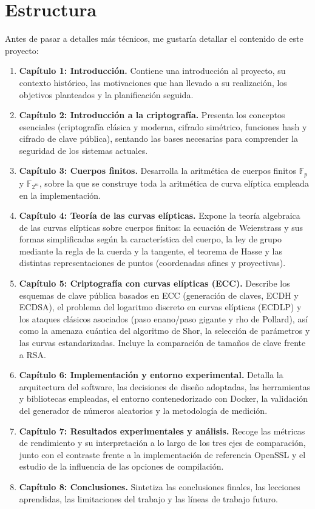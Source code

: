 \section{Estructura}
Antes de pasar a detalles más técnicos, me gustaría detallar el contenido
de este proyecto:

\begin{enumerate}
  \item \textbf{Capítulo 1: Introducción.}  
    Contiene una introducción al proyecto, su contexto histórico, las motivaciones que han llevado a su realización, los objetivos planteados y la planificación seguida.
  \item \textbf{Capítulo 2: Introducción a la criptografía.}  
    Presenta los conceptos esenciales (criptografía clásica y moderna, cifrado simétrico, funciones hash y cifrado de clave pública), sentando las bases necesarias para comprender la seguridad de los sistemas actuales.
  \item \textbf{Capítulo 3: Cuerpos finitos.}  
    Desarrolla la aritmética de cuerpos finitos $\mathbb{F}_p$ y $\mathbb{F}_{2^m}$, sobre la que se construye toda la aritmética de curva elíptica empleada en la implementación.
  \item \textbf{Capítulo 4: Teoría de las curvas elípticas.}  
    Expone la teoría algebraica de las curvas elípticas sobre cuerpos finitos: la ecuación de Weierstrass y sus formas simplificadas según la característica del cuerpo, la ley de grupo mediante la regla de la cuerda y la tangente, el teorema de Hasse y las distintas representaciones de puntos (coordenadas afines y proyectivas).
  \item \textbf{Capítulo 5: Criptografía con curvas elípticas (ECC).}  
    Describe los esquemas de clave pública basados en ECC (generación de claves, ECDH y ECDSA), el problema del logaritmo discreto en curvas elípticas (ECDLP) y los ataques clásicos asociados (paso enano/paso gigante y rho de Pollard), así como la amenaza cuántica del algoritmo de Shor, la selección de parámetros y las curvas estandarizadas. Incluye la comparación de tamaños de clave frente a RSA.
  \item \textbf{Capítulo 6: Implementación y entorno experimental.}  
    Detalla la arquitectura del software, las decisiones de diseño adoptadas, las herramientas y bibliotecas empleadas, el entorno contenedorizado con Docker, la validación del generador de números aleatorios y la metodología de medición.
  \item \textbf{Capítulo 7: Resultados experimentales y análisis.}  
    Recoge las métricas de rendimiento y su interpretación a lo largo de los tres ejes de comparación, junto con el contraste frente a la implementación de referencia OpenSSL y el estudio de la influencia de las opciones de compilación.
  \item \textbf{Capítulo 8: Conclusiones.}
    Sintetiza las conclusiones finales, las lecciones aprendidas, las limitaciones del trabajo y las líneas de trabajo futuro.
\end{enumerate}

